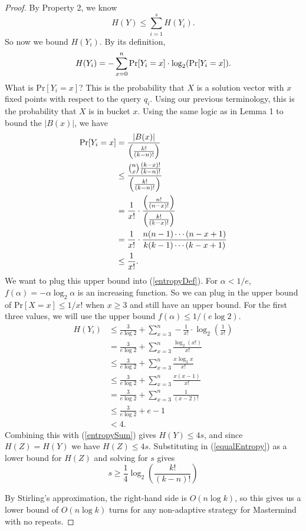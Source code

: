 \documentclass[12pt, a4paper]{article}
\begin{document}
\begin{proof}
	By Property 2, we know
	\begin{equation}\label{entropySum}
	H(Y) \leq \sum_{i=1}^s H(Y_i).
	\end{equation}
	So now we bound $H(Y_i)$. By its definition,
	\begin{equation}\label{entropyDef}
	H(Y_i)=-\sum_{x=0}^n \textnormal{Pr}[Y_i=x]\cdot\log_2(\textnormal{Pr}[Y_{i}=x]).
	\end{equation}
	What is Pr$[Y_i = x]$? This is the probability that $X$ is a solution vector with $x$
	fixed points with respect to the query $q_i$. Using our previous terminology, this is
	the probability that $X$ is in bucket $x$.
	Using the same logic as in Lemma 1 to bound the $|B(x)|$, we have
	\begin{align*}
	\textnormal{Pr}[Y_i = x] &= \frac{|B(x)|}{\left(\frac{k!}{(k-n)!}\right)}\\
	&\leq \frac{\binom{n}{x}\frac{(k-x)!}{(k-n)!}}{\left(\frac{k!}{(k-n)!}\right)}\\
	& = \frac{1}{x!}\cdot
	\frac{\left(\frac{n!}{(n-x)!}\right)}{\left(\frac{k!}{(k-x)!}\right)}\\
	&= \frac{1}{x!}\cdot\frac{n(n-1)\cdots(n-x+1)}{k(k-1)\cdots(k-x+1)}\\
	&\leq \frac{1}{x!}.
	\end{align*}
	We want to plug this upper bound into (\ref{entropyDef}).
	For $\alpha<1/e$, $f(\alpha)=-\alpha\log_2\alpha$ is an increasing function.
	So we can plug in the upper bound of $\text{Pr}[X=x]\le 1/x!$ when $x\ge 3$ and
	still have an upper bound. For the first three values, we will use the upper bound
	$f(\alpha)\le 1/(e\log 2)$. 
	\begin{align*}
	H(Y_i) &\leq \frac{3}{e\log 2}+\sum_{x=3}^n-\frac{1}{x!}\cdot\log_2(\frac{1}{x!})\\
	&= \frac{3}{e\log 2}+\sum_{x=3}^n \frac{\log_2(x!)}{x!}\\
	&\leq \frac{3}{e\log 2}+\sum_{x=3}^n \frac{x \log_2 x}{x!}\\
	&\leq \frac{3}{e\log 2}+\sum_{x=3}^n \frac{x (x-1)}{x!}\\
	&= \frac{3}{e\log 2}+\sum_{x=3}^n \frac{1}{(x-2)!}\\
	&\leq \frac{3}{e\log 2}+e-1\\
	& < 4.
	\end{align*}
	Combining this with (\ref{entropySum}) gives $H(Y) \leq 4s$, and since $H(Z) = H(Y)$ we have $H(Z) \leq 4s$. Substituting in (\ref{equalEntropy}) as a lower bound for $H(Z)$ and solving for $s$ gives
	\begin{equation*}
	s \geq \frac{1}{4}\log_2\left(\frac{k!}{(k-n)!}\right)
	\end{equation*}
	
	By Stirling's approximation, the right-hand side is $O(n\log k)$, so this gives us a lower bound of $O(n \log k)$ turns for any non-adaptive strategy for
	Mastermind with no repeats.
\end{proof}
\end{document}
